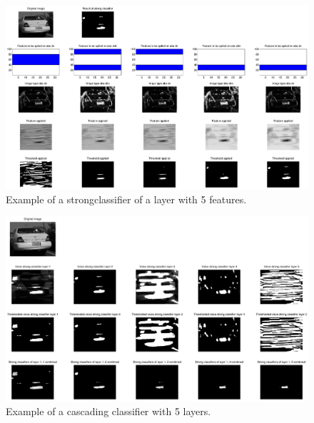 \documentclass[a4paper,11pt]{article}
\begin{document}
\begin{figure}[!ht]
\centering
\includegraphics[width=18cm]{img/strongClassifier_layer2_img14}
\caption{Example of a strongclassifier of a layer with 5 features.}
\label{fig:strongclassify}
\end{figure}

\begin{figure}[!ht]
\centering
\includegraphics[width=18cm]{img/cascader_img14}
\caption{Example of a cascading classifier with 5 layers.}
\label{fig:calcader}
\end{figure}
\end{document}
